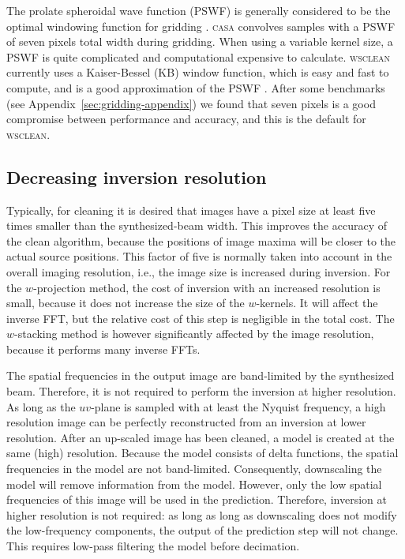 \documentclass[useAMS,usenatbib]{mn2e}
\begin{document}
The prolate spheroidal wave function (PSWF) is generally considered to be the optimal windowing function for gridding \citep{fourier-kernel-selection-1991}. \textsc{casa} convolves samples with a PSWF of seven pixels total width during gridding. When using a variable kernel size, a PSWF is quite complicated and computational expensive to calculate. \textsc{wsclean} currently uses a Kaiser-Bessel (KB) window function, which is easy and fast to compute, and is a good approximation of the PSWF \citep{fourier-kernel-selection-1991}. After some benchmarks (see Appendix~\ref{sec:gridding-appendix}) we found that seven pixels is a good compromise between performance and accuracy, and this is the default for \textsc{wsclean}.

\subsection{Decreasing inversion resolution} \label{sec:decreasing-inversion-resolution}
Typically, for cleaning it is desired that images have a pixel size at least five times smaller than the synthesized-beam width. This improves the accuracy of the clean algorithm, because the positions of image maxima will be closer to the actual source positions. This factor of five is normally taken into account in the overall imaging resolution, i.e., the image size is increased during inversion. For the $w$-projection method, the cost of inversion with an increased resolution is small, because it does not increase the size of the $w$-kernels. It will affect the inverse FFT, but the relative cost of this step is negligible in the total cost. The $w$-stacking method is however significantly affected by the image resolution, because it performs many inverse FFTs.

The spatial frequencies in the output image are band-limited by the synthesized beam. Therefore, it is not required to perform the inversion at higher resolution. As long as the $uv$-plane is sampled with at least the Nyquist frequency, a high resolution image can be perfectly reconstructed from an inversion at lower resolution. After an up-scaled image has been cleaned, a model is created at the same (high) resolution. Because the model consists of delta functions, the spatial frequencies in the model are not band-limited. Consequently, downscaling the model will remove information from the model. However, only the low spatial frequencies of this image will be used in the prediction. Therefore, inversion at higher resolution is not required: as long as long as downscaling does not modify the low-frequency components, the output of the prediction step will not change. This requires low-pass filtering the model before decimation.
\end{document}
